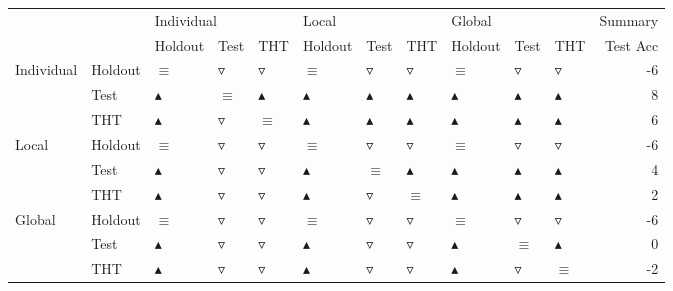 \begin{table}
\centering
\label{tab:statistical_high_generalization_performance}
\begin{tabular}{lllllllllllr}
\toprule
       &     & \multicolumn{3}{l}{Individual} & \multicolumn{3}{l}{Local} & \multicolumn{3}{l}{Global} &  Summary \\
       &     &           Holdout &             Test &               THT &           Holdout &              Test &               THT &           Holdout &              Test &               THT & Test Acc \\
\midrule
Individual & Holdout &          $\equiv$ &  $\triangledown$ &   $\triangledown$ &          $\equiv$ &   $\triangledown$ &   $\triangledown$ &          $\equiv$ &   $\triangledown$ &   $\triangledown$ &       -6 \\
       & Test &  $\blacktriangle$ &         $\equiv$ &  $\blacktriangle$ &  $\blacktriangle$ &  $\blacktriangle$ &  $\blacktriangle$ &  $\blacktriangle$ &  $\blacktriangle$ &  $\blacktriangle$ &        8 \\
       & THT &  $\blacktriangle$ &  $\triangledown$ &          $\equiv$ &  $\blacktriangle$ &  $\blacktriangle$ &  $\blacktriangle$ &  $\blacktriangle$ &  $\blacktriangle$ &  $\blacktriangle$ &        6 \\
Local & Holdout &          $\equiv$ &  $\triangledown$ &   $\triangledown$ &          $\equiv$ &   $\triangledown$ &   $\triangledown$ &          $\equiv$ &   $\triangledown$ &   $\triangledown$ &       -6 \\
       & Test &  $\blacktriangle$ &  $\triangledown$ &   $\triangledown$ &  $\blacktriangle$ &          $\equiv$ &  $\blacktriangle$ &  $\blacktriangle$ &  $\blacktriangle$ &  $\blacktriangle$ &        4 \\
       & THT &  $\blacktriangle$ &  $\triangledown$ &   $\triangledown$ &  $\blacktriangle$ &   $\triangledown$ &          $\equiv$ &  $\blacktriangle$ &  $\blacktriangle$ &  $\blacktriangle$ &        2 \\
Global & Holdout &          $\equiv$ &  $\triangledown$ &   $\triangledown$ &          $\equiv$ &   $\triangledown$ &   $\triangledown$ &          $\equiv$ &   $\triangledown$ &   $\triangledown$ &       -6 \\
       & Test &  $\blacktriangle$ &  $\triangledown$ &   $\triangledown$ &  $\blacktriangle$ &   $\triangledown$ &   $\triangledown$ &  $\blacktriangle$ &          $\equiv$ &  $\blacktriangle$ &        0 \\
       & THT &  $\blacktriangle$ &  $\triangledown$ &   $\triangledown$ &  $\blacktriangle$ &   $\triangledown$ &   $\triangledown$ &  $\blacktriangle$ &   $\triangledown$ &          $\equiv$ &       -2 \\
\bottomrule
\end{tabular}
\end{table}
